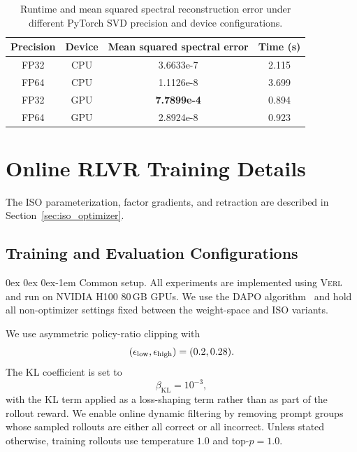 \documentclass[11pt, a4paper]{utda}
\makeatletter
\renewcommand{\paragraph}{%
  \@startsection{paragraph}{4}%
  {\z@}{0ex \@plus 0ex \@minus 0ex}{-1em}%
  {\normalfont\normalsize\bfseries}%
}
\theoremstyle{plain}
\theoremstyle{definition}
\theoremstyle{remark}
\makeatother
\begin{document}
\begin{table}[ht!]
    \centering
    \caption{
        Runtime and mean squared spectral reconstruction error under different
        PyTorch SVD precision and device configurations.
        }
    \label{tab:torchsvd_speed_error}
    \begin{tabular}{cc|cc}
        \toprule
        Precision & Device & Mean squared spectral error & Time (s) \\
        \midrule
        FP32  & CPU & 3.6633e-7 & 2.115  \\
        FP64  & CPU & 1.1126e-8 & 3.699 \\
        FP32  & GPU & \textbf{7.7899e-4} & 0.894 \\
        FP64  & GPU & 2.8924e-8 & 0.923 \\
        \bottomrule
    \end{tabular}\label{tab:svd_precision}
\end{table}


\section{Online RLVR Training Details}
\label{app:training_details}

The ISO parameterization, factor gradients, and retraction are described in
Section~\ref{sec:iso_optimizer}. 

\subsection{Training and Evaluation Configurations}

\paragraph{Common setup.}
All experiments are implemented using
\textsc{Verl}~\cite{sheng2025hybridflow} and run on NVIDIA H100 80\,GB GPUs.
We use the DAPO algorithm~\cite{yu2025dapo} and hold all non-optimizer
settings fixed between the weight-space and ISO variants.

We use asymmetric policy-ratio clipping with
\begin{equation}
\small
    (\epsilon_{\mathrm{low}},\epsilon_{\mathrm{high}})
    =
    (0.2,0.28).
\end{equation}
The KL coefficient is set to
\[
    \beta_{\mathrm{KL}}
    =
    10^{-3},
\]
with the KL term applied as a loss-shaping term rather than as part of the
rollout reward. We enable online dynamic filtering by removing prompt groups
whose sampled rollouts are either all correct or all incorrect. Unless stated
otherwise, training rollouts use temperature $1.0$ and top-$p=1.0$.
\end{document}
